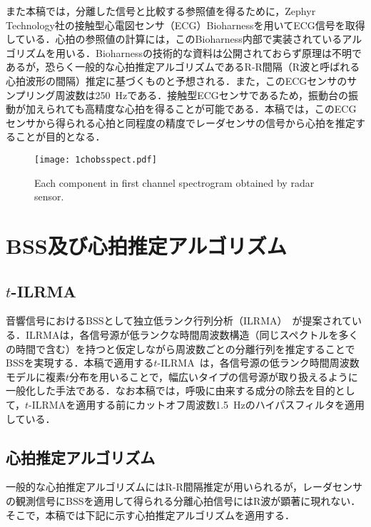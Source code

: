 \documentclass[a4j]{jsarticle}
\begin{document}
また本稿では，分離した信号と比較する参照値を得るために，Zephyr Technology社の接触型心電図センサ（ECG）Bioharnessを用いてECG信号を取得している．心拍の参照値の計算には，このBioharness内部で実装されているアルゴリズムを用いる．Bioharnessの技術的な資料は公開されておらず原理は不明であるが，恐らく一般的な心拍推定アルゴリズムであるR-R間隔（R波と呼ばれる心拍波形の間隔）推定に基づくものと予想される．また，このECGセンサのサンプリング周波数は250~Hzである．接触型ECGセンサであるため，振動台の振動が加えられても高精度な心拍を得ることが可能である．本稿では，このECGセンサから得られる心拍と同程度の精度でレーダセンサの信号から心拍を推定することが目的となる．

\begin{figure}[t]
  \centering
  \vspace{0pt} %
  \texttt{[image: 1chobsspect.pdf]}
  \vspace{-20pt} %
  \caption{Each component in first channel spectrogram obtained by radar sensor.}
  \vspace{-20pt} %
  \label{fig:1chobs}
\end{figure}

\section{BSS及び心拍推定アルゴリズム}

\subsection{$t$-ILRMA}
音響信号におけるBSSとして独立低ランク行列分析（ILRMA）~\cite{ILRMA}が提案されている．ILRMAは，各信号源が低ランクな時間周波数構造（同じスペクトルを多くの時間で含む）を持つと仮定しながら周波数ごとの分離行列を推定することでBSSを実現する．本稿で適用する$t$-ILRMA~\cite{tdist1}は，各信号源の低ランク時間周波数モデルに複素$t$分布を用いることで，幅広いタイプの信号源が取り扱えるように一般化した手法である．なお本稿では，呼吸に由来する成分の除去を目的として，$t$-ILRMAを適用する前にカットオフ周波数1.5~Hzのハイパスフィルタを適用している．

\subsection{心拍推定アルゴリズム}
一般的な心拍推定アルゴリズムにはR-R間隔推定が用いられるが，レーダセンサの観測信号にBSSを適用して得られる分離心拍信号にはR波が顕著に現れない．そこで，本稿では下記に示す心拍推定アルゴリズムを適用する．
\end{document}
